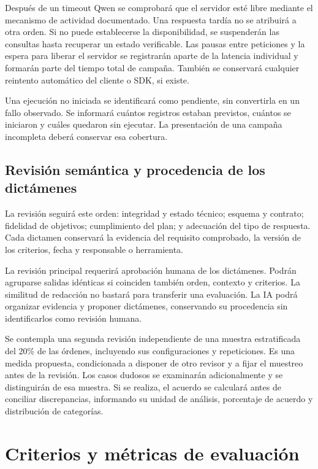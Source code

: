 Después de un timeout Qwen se comprobará que el servidor esté libre
mediante el mecanismo de actividad documentado. Una respuesta tardía
no se atribuirá a otra orden. Si no puede establecerse la disponibilidad,
se suspenderán las consultas hasta recuperar un estado verificable.
Las pausas entre peticiones y la espera para liberar el servidor se
registrarán aparte de la latencia individual y formarán parte del tiempo
total de campaña. También se conservará cualquier reintento automático
del cliente o SDK, si existe.

Una ejecución no iniciada se identificará como pendiente, sin convertirla
en un fallo observado. Se informará cuántos registros estaban previstos,
cuántos se iniciaron y cuáles quedaron sin ejecutar. La presentación de
una campaña incompleta deberá conservar esa cobertura.

\subsection{Revisión semántica y procedencia de los dictámenes}

La revisión seguirá este orden: integridad y estado técnico; esquema y
contrato; fidelidad de objetivos; cumplimiento del plan; y adecuación del
tipo de respuesta. Cada dictamen conservará la evidencia del requisito
comprobado, la versión de los criterios, fecha y responsable o herramienta.

La revisión principal requerirá aprobación humana de los dictámenes.
Podrán agruparse salidas idénticas si coinciden también orden, contexto
y criterios. La similitud de redacción no bastará para transferir una
evaluación. La IA podrá organizar evidencia y proponer dictámenes,
conservando su procedencia sin identificarlos como revisión humana.

Se contempla una segunda revisión independiente de una muestra
estratificada del 20\% de las órdenes, incluyendo sus configuraciones y
repeticiones. Es una medida propuesta, condicionada a disponer de otro
revisor y a fijar el muestreo antes de la revisión. Los casos dudosos se
examinarán adicionalmente y se distinguirán de esa muestra. Si se realiza,
el acuerdo se calculará antes de conciliar discrepancias, informando su
unidad de análisis, porcentaje de acuerdo y distribución de categorías.

\section{Criterios y métricas de evaluación}

